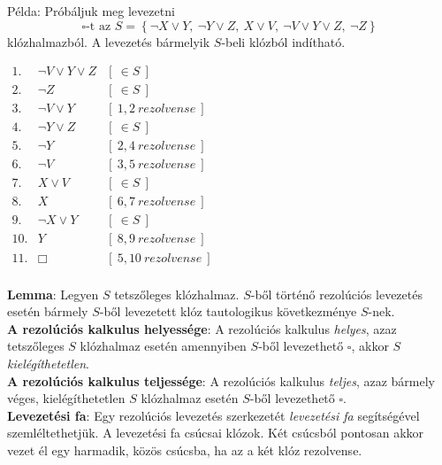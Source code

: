 \documentclass[tikz,12pt,margin=0px]{article}
\begin{document}
    \noindent Példa: Próbáljuk meg levezetni
    \[
        \square\text{-t az }S = \left\{\neg X \vee Y\boldsymbol{,}\ \neg Y \vee Z\boldsymbol{,}\ X \vee V\boldsymbol{,}\ \neg V \vee Y \vee Z\boldsymbol{,}\ \neg Z \right\}
    \]
	klózhalmazból. A levezetés bármelyik $S$-beli klózból indítható.
	
    \begin{center}
        $\begin{array}{rll}
        1. & \neg V \vee Y \vee Z & [\ \in S\ ] \\
        2. & \neg Z & [\ \in S\ ] \\
        3. & \neg V \vee Y & [\ 1,2\ rezolvense\ ] \\
        4. & \neg Y \vee Z & [\ \in S\ ] \\
        5. & \neg Y & [\ 2,4\ rezolvense\ ] \\
        6. & \neg V & [\ 3,5\ rezolvense\ ] \\
        7. & X \vee V & [\ \in S\ ] \\
        8. & X & [\ 6,7\ rezolvense\ ] \\
        9. & \neg X \vee Y & [\ \in S\ ] \\
        10. & Y & [\ 8,9\ rezolvense\ ] \\
        11. & \Box & [\ 5,10\ rezolvense\ ] \\
        \end{array}$
  \end{center}
	
	\noindent \textbf{Lemma}: Legyen $S$ tetszőleges klózhalmaz. $S$-ből történő rezolúciós levezetés esetén bármely $S$-ből
	levezetett klóz tautologikus következménye $S$-nek.\\
	
	\noindent \textbf{A rezolúciós kalkulus helyessége}: A rezolúciós kalkulus \textit{helyes}, azaz tetszőleges
	$S$ klózhalmaz esetén amennyiben $S$-ből levezethető $\square$, akkor $S$ \textit{kielégíthetetlen}.\\
	
	\noindent \textbf{A rezolúciós kalkulus teljessége}: A rezolúciós kalkulus \textit{teljes}, azaz bármely véges, kielégíthetetlen
	$S$ klózhalmaz esetén $S$-ből levezethető $\square$.\\	
	
	\noindent \textbf{Levezetési fa}: Egy rezolúciós levezetés szerkezetét \textit{levezetési fa} segítségével szemléltethetjük.
	A levezetési fa csúcsai klózok. Két csúcsból pontosan akkor vezet él egy harmadik, közös csúcsba, ha az a két klóz rezolvense.
	
\end{document}
